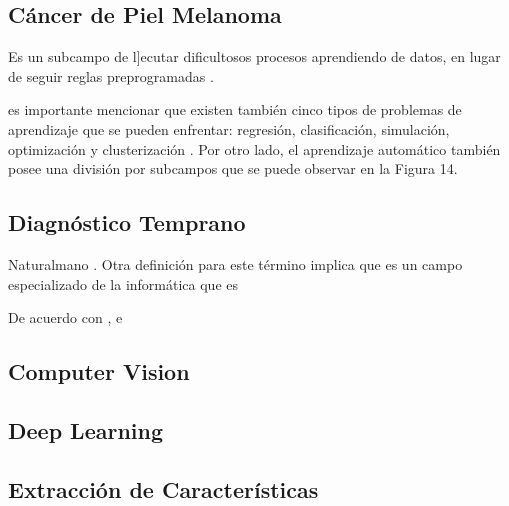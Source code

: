 \subsection{Cáncer de Piel Melanoma}
 Es un subcampo de l]ecutar dificultosos procesos aprendiendo de datos, en lugar de seguir reglas preprogramadas \parencite{tec_royal2017machine}.

 es importante mencionar que existen también cinco tipos de problemas de aprendizaje que se pueden enfrentar: regresión, clasificación, simulación, optimización y clusterización \parencite{bk_gollapudi2016practical}. Por otro lado, el aprendizaje automático también posee una división por subcampos que se puede observar en la Figura 14.
 \subsection{Diagnóstico Temprano}
 Naturalmano \parencite{bk_goyal2018deep}. Otra definición para este término implica que es un campo especializado de la informática que es

 De acuerdo con \citet{bk_goyal2018deep}, e
 


\subsection{Computer Vision}

\subsection{Deep Learning}

\subsection{Extracción de Características}
